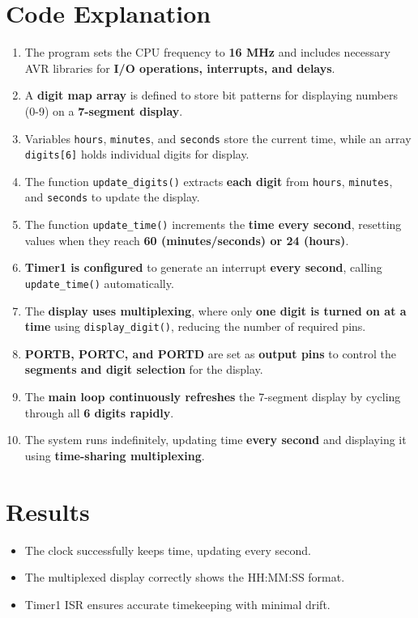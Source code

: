 \documentclass[12pt,a4paper]{article}
\begin{document}
\section{Code Explanation}
\begin{enumerate}
    \item The program sets the CPU frequency to \textbf{16 MHz} and includes necessary AVR libraries for \textbf{I/O operations, interrupts, and delays}.
    \item A \textbf{digit map array} is defined to store bit patterns for displaying numbers (0-9) on a \textbf{7-segment display}.
    \item Variables \texttt{hours}, \texttt{minutes}, and \texttt{seconds} store the current time, while an array \texttt{digits[6]} holds individual digits for display.
    \item The function \texttt{update\_digits()} extracts \textbf{each digit} from \texttt{hours}, \texttt{minutes}, and \texttt{seconds} to update the display.
    \item The function \texttt{update\_time()} increments the \textbf{time every second}, resetting values when they reach \textbf{60 (minutes/seconds) or 24 (hours)}.
    \item \textbf{Timer1 is configured} to generate an interrupt \textbf{every second}, calling \texttt{update\_time()} automatically.
    \item The \textbf{display uses multiplexing}, where only \textbf{one digit is turned on at a time} using \texttt{display\_digit()}, reducing the number of required pins.
    \item \textbf{PORTB, PORTC, and PORTD} are set as \textbf{output pins} to control the \textbf{segments and digit selection} for the display.
    \item The \textbf{main loop continuously refreshes} the 7-segment display by cycling through all \textbf{6 digits rapidly}.
    \item The system runs indefinitely, updating time \textbf{every second} and displaying it using \textbf{time-sharing multiplexing}.
\end{enumerate}

\section{Results}
\begin{itemize}
\item The clock successfully keeps time, updating every second.
\item The multiplexed display correctly shows the HH:MM:SS format.
\item Timer1 ISR ensures accurate timekeeping with minimal drift.
\end{itemize}
\end{document}
